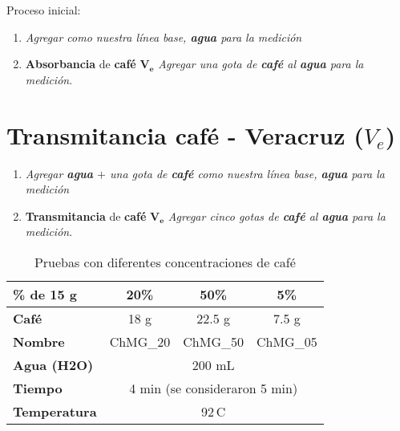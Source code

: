 \documentclass{article}
\begin{document}
Proceso inicial: \vspace{0.5cm}

\begin{enumerate}
	\item \emph{Agregar como nuestra línea base, \textcolor{Tarawera}{\bfseries{agua}} para la medición}\\
	\item \textcolor{Cinnabar}{\textbf{Absorbancia}} de \textcolor{Metallic Bronze}{\textbf{café}}  $\boldsymbol{V_{e}}$ \emph{Agregar una gota de \textcolor{Metallic Bronze}{\textbf{café}} al \textcolor{Tarawera}{\bfseries{agua}} para la medición}.  
\end{enumerate} 


 

\section{\textcolor{Apple Green}{\textbf{Transmitancia}} \textcolor{Metallic Bronze}{\textbf{café}} - Veracruz ($V_{e}$)} \vspace{0.5cm}



\begin{enumerate}
	\item \emph{Agregar  \textcolor{Tarawera}{\bfseries{agua}} $+$ una gota de \textcolor{Metallic Bronze}{\textbf{café}} como nuestra línea base, \textcolor{Tarawera}{\bfseries{agua}} para la medición}\\
	\item \textcolor{Apple Green}{\textbf{Transmitancia}} de \textcolor{Metallic Bronze}{\textbf{café}}  $\boldsymbol{V_{e}}$ \emph{Agregar cinco gotas de \textcolor{Metallic Bronze}{\textbf{café}} al \textcolor{Tarawera}{\bfseries{agua}} para la medición}.  
\end{enumerate}  \vspace{0.5cm}







\begin{table}[H]
	\centering
	\caption{Pruebas con diferentes concentraciones de café}
	\label{tabla:pruebas_cafe}
	\begin{tabular}{@{}lccc@{}}
		\toprule
		\textbf{\% de 15 g} & \textbf{20\%} & \textbf{50\%} & \textbf{5\%} \\
		\midrule
		\textbf{Café} & 18 g & 22.5 g & 7.5 g \\
		\textbf{Nombre} & ChMG\_20 & ChMG\_50 & ChMG\_05 \\
		\textbf{Agua ({H2O})} & \multicolumn{3}{c}{200 mL} \\
		\textbf{Tiempo} & \multicolumn{3}{c}{4 min (se consideraron 5 min)} \\
		\textbf{Temperatura} & \multicolumn{3}{c}{92\,\textdegree C} \\
		\bottomrule
	\end{tabular}
\end{table} \newpage
\end{document}
